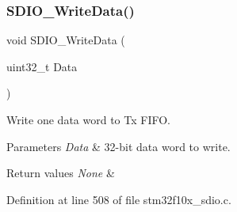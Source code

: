 \subsubsection{\texorpdfstring{S\+D\+I\+O\+\_\+\+Write\+Data()}{SDIO\_WriteData()}}
{\footnotesize\ttfamily void S\+D\+I\+O\+\_\+\+Write\+Data (\begin{DoxyParamCaption}\item[{uint32\+\_\+t}]{Data }\end{DoxyParamCaption})}



Write one data word to Tx F\+I\+FO. 


\begin{DoxyParams}{Parameters}
{\em Data} & 32-\/bit data word to write. \\
\hline
\end{DoxyParams}

\begin{DoxyRetVals}{Return values}
{\em None} & \\
\hline
\end{DoxyRetVals}


Definition at line 508 of file stm32f10x\+\_\+sdio.\+c.

